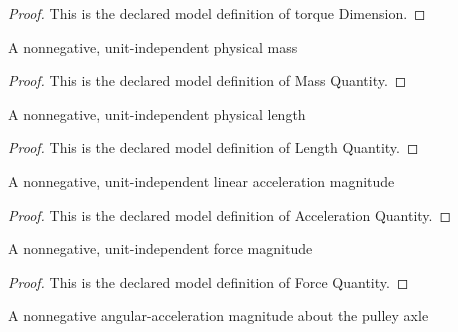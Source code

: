 \begin{proof}
  This is the declared model definition of torque Dimension.
\end{proof}
\begin{definition}
  \label{def:physics:phyx-mini-0778:phyxminiproblems-problemphyxmini0778-massquantity}
  A nonnegative, unit-independent physical mass
\end{definition}
\begin{proof}
  This is the declared model definition of Mass Quantity.
\end{proof}
\begin{definition}
  \label{def:physics:phyx-mini-0778:phyxminiproblems-problemphyxmini0778-lengthquantity}
  A nonnegative, unit-independent physical length
\end{definition}
\begin{proof}
  This is the declared model definition of Length Quantity.
\end{proof}
\begin{definition}
  \label{def:physics:phyx-mini-0778:phyxminiproblems-problemphyxmini0778-accelerationquantity}
  A nonnegative, unit-independent linear acceleration magnitude
\end{definition}
\begin{proof}
  This is the declared model definition of Acceleration Quantity.
\end{proof}
\begin{definition}
  \label{def:physics:phyx-mini-0778:phyxminiproblems-problemphyxmini0778-forcequantity}
  A nonnegative, unit-independent force magnitude
\end{definition}
\begin{proof}
  This is the declared model definition of Force Quantity.
\end{proof}
\begin{definition}
  \label{def:physics:phyx-mini-0778:phyxminiproblems-problemphyxmini0778-angularaccelerationquantity}
  A nonnegative angular-acceleration magnitude about the pulley axle
\end{definition}
